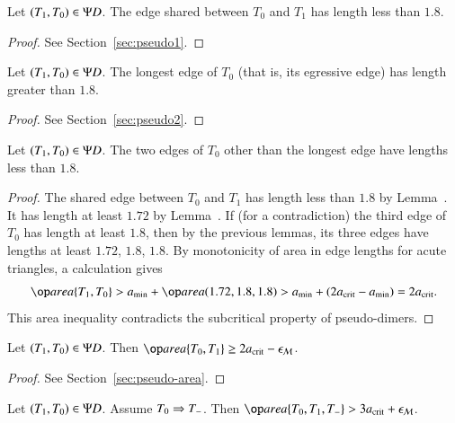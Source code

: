 \begin{lemma}  
Let $(T_1,T_0)\in \Psi D$.  The edge shared between
$T_0$ and $T_1$ has length less than $1.8$. 
\end{lemma}

\begin{proof} See Section~\ref{sec:pseudo1}.
\end{proof}

\begin{lemma} 
  Let $(T_1,T_0)\in \Psi D$.  The longest edge of $T_0$ (that is, its
  egressive edge) has length greater than $1.8$.
\end{lemma}

\begin{proof} See Section~\ref{sec:pseudo2}.
\end{proof}

\begin{lemma}  
  Let $(T_1,T_0)\in \Psi D$.  The two edges of $T_0$ other than the
  longest edge have lengths less than $1.8$.
\end{lemma}

\begin{proof}
  The shared edge between $T_0$ and $T_1$ has length less than $1.8$
  by Lemma~.  It has length at least $1.72$ by
  Lemma~.  If (for a contradiction) the third edge of
  $T_0$ has length at least $1.8$, then by the previous lemmas, its
  three edges have lengths at least $1.72$, $1.8$, $1.8$.  
By monotonicity of area in edge lengths for acute triangles, a calculation gives
\[
\area\{T_1,T_0\} > \ao + \area(1.72,1.8,1.8) 
> \ao + (2\acrit -\ao) = 2\acrit.
\]
This area inequality contradicts the subcritical property of pseudo-dimers.
\end{proof}

\begin{lemma}
Let $(T_1,T_0)\in\Psi D$.  Then $\area\{T_0,T_1\} \ge 2\acrit - \epsM$.
\end{lemma}

\begin{proof} See Section~\ref{sec:pseudo-area}.
\end{proof}

\begin{lemma}
Let $(T_1,T_0)\in\Psi D$. Assume $T_0\Rightarrow T_-$.  
Then $\area\{T_0,T_1,T_-\} > 3\acrit + \epsM$.
\end{lemma}

